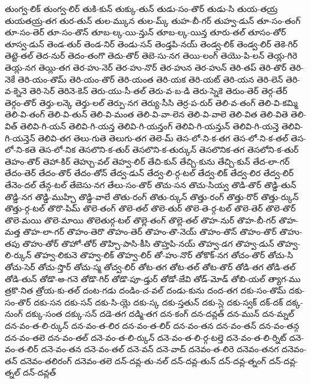 {తుంగ్వ-లిక్
తుంగ్వ-లిర్
తుకి-కున్
తుక్కు-తున్
తుడు-సం-తొర్
తుడు-సి
తుయ-తయ్ర
తుయతయ్ర-తగ
తుర-తున్
తుల-మ్కున
తుల-మ్క్
తుహ-బీ-గర్
తుహ్వ-డున్
తూ-సం-తంగ్
తూ-సం-తెర్
తూ-సం-తొన్
తూబ-ల్క-యి-న్తున్
తూబ-ల్క-యిన్త
తూరు-తల్
తూసం-తోర్
తూస్వ-డున్
తెండ-తుర్
తెండ-నిర్
తెండు-సన్
తెండ్తపి-నయ్
తెండ్వ-లిక్
తెండ్వ-లిర్
తెకె-గిర్
తెట్టె-తల్
తెద-నుర్
తెదం-తంగొ
తెదు-తొర్
తెబె-సు-నగ
తెయి-లంగ్
తెయొ-పి-లన్
తెయ్ల-గిరె
తెయ్ల-నగ
తెయ్లి-తగ
తెర-హు-నెర్
తెర-హు-నొర్
తెర-హున
తెర-హున్
తెరి-తప్
తెరి-తొర్
తెరి-నెకే
తెరి-యం-తొమ్
తెరి-యం-తొర్
తెరి-యంత
తెరి-యక
తెరి-యట్
తెరి-యన
తెరి-లెన్
తెరి-వ-క్నెనె
తెరి-సెర్
తెరినె-కెన్
తెరు-యు-సీ-తల్
తెరు-వ-బ-డి
తెరు-స్నెకె
తెరుం-తెర్
తెర్గ-తేర్
తెర్గం-తొర్
తెర్తు-లన్కె
తెర్తు-లల్
తెర్పు-నగ
తెర్యు-సీసి
తెర్ర-ప-రుర్
తెలి-వ-తంగ్
తెలి-వి-కమ్మి
తెలి-వి-తంగ్
తెలి-వి-తున్
తెలి-వి-మంత
తెలి-వి-వా-లెన
తెలి-వి-వాలె
తెలి-విత
తెలి-వితె
తెలి-విత్
తెలివి-గి-యన్
తెలివి-గి-యన్త
తెలివి-గి-యన్తంగ్
తెలివి-గి-యన్తున్
తెలివి-గి-యన్తె
తెలివి-గి-యన్తెన్
తెలివి-తగ
తెలు-గుతె
తెలుగు-తగ
తెలె-మ్
తెస-లో-ని-క-తగ
తెస-లో-ని-క-తల్
తెస-లో-ని-కతె
తెస-లో-నిక
తెసలొని-క-తుర్
తెసలొని-క-తుర్కున్
తెసలొనిక-తగ
తెసలోని-క-తుర్
తెహం-తొర్
తెహా-కిర్
తెహ్చు-వల్
తెహ్వ-లిర్
తేచి-కున్
తేచ్చి-కును
తేచ్చి-కున్
తేద-లా-గర్
తేదం-తెర్
తేదం-తొర్
తేదం-తోన్
తేద్వ-డున్
తేద్వ-లి-ర్గ-టల్
తేద్వ-లిక్
తేద్వ-లిర
తేద్వ-లిర్
తేనెం-దల్
తేన్గ-టల్
తేబెసు-నగ
తేలు-సం-తొర్
తొచు-సన
తొచు-సియ్వ
తొడి-తొర్
తొడ్డి-తున్
తొడ్డి-నగ
తొడ్డి-ముహ్చి
తొడ్డి-వాలే
తొతు-రంగ్
తొతు-ర్కున్
తొత్తు-రంగ్
తొత్తు-రొర్
తొత్తు-ర్కున్
తొత్తు-ర్గ-టల్
తొరొ-పిమ్
తొలె-తంగ్
తొలె-తల్
తొలె-తుర్
తొలె-తె-ర్గ-టల్
తొలె-తెర్
తొలె-తొర్
తొలె-మయి
తొలె-మాయి
తొలెతుర్గ-టల్
తొల్లె-తంగ్
తొల్లె-తల్
తొహ-నుర్
తొహ-బీ-గర్
తొహ-మత్త
తొహ-లా-గర్
తొహం-తెరొ
తొహం-తెర్
తొహం-తొ-నెయ్
తొహం-తొన్
తొహం-తొర్
తొహు-తపు
తొహు-తోర్
తొహో-తోర్
తొహ్చి-పాసి-కీసి
తొహ్తపి-నయ్
తొహ్వ-డగ
తొహ్వ-డున్
తొహ్వ-లి-ర్కున్
తొహ్వ-లికునె
తొహ్వ-లిక్
తొహ్వ-లిర్
తో-హు-నొర్
తోకొక్-నగ
తోచం-తొర్
తోచు-సి
తోచు-సెర్
తోచు-స్తొర్
తోచు-స్మ
తోచ్వ-లిర్
తోట-తగ
తోట-తల్
తోట-తొర్
తోడి-తగ
తోడి-తల్
తోడి-తున్
తోడొ-అ-గనె
తోడొ-గిర్
తోడొ-పూ-డ్తుర్
తోడో-జేవి
తోడ్-మోడ్
తోబి-యల్
త్యాగ-ము
త్రకొ-నిత
త్రోయ-కు-తల్
దంట-గడు
దండిం-చ-వల్
దండు-కును
దంద-తగ
దకు-సం-తొమ్
దకు-సం-తొర్
దకు-సన
దకు-సన్
దకు-సి-య్లె
దకు-స్క
దకు-స్తతున్
దకు-స్లె
దకు-స్వక్
దక్-దక్
దక్క-నుంగ్
దక్కు-సంత
దక్కు-సన్
దడె-తగ
దడ్మి-తగ
దన-కంగ్
దన-దవ్లత్
దన-మున్
దన-మ్నల్
దన-వం-త-లి-ర్కున్
దన-వం-త-లిర
దన-వం-త-లిర్
దన-వం-తన
దన-వం-తన్
దన-వం-తన్గ
దన-వం-తలె
దన-వం-తల్
దనె-వం-త-లి-ర్కున్
దనె-వం-త-లి-ర్గ-టల్తె
దనె-వం-త-లి-ర్నిట్
దనె-వం-త-లిర్
దనె-వం-తన
దనె-వం-తల్
దనె-వన్
దనె-వాద్
దనెవం-త-లిరె
దనెవం-తనగ
దనెవం-తన్
దనెవం-తలిరంగ్
దనెవం-తలె
దన్-దవ్ల-తు-నల్
దన్-దవ్ల-తున్
దన్-దవ్ల-త్నంగ్
దన్-దవ్ల-త్నల్
దన్-దవ్లత్
}
